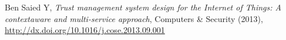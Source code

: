 

    \begin{thebibliography}{9}
            Ben Saied Y,
            \textit{Trust management system design for the Internet of Things: A contextaware and multi-service approach},
            Computers \& Security (2013),
            \url{http://dx.doi.org/10.1016/j.cose.2013.09.001}
    \end{thebibliography}


